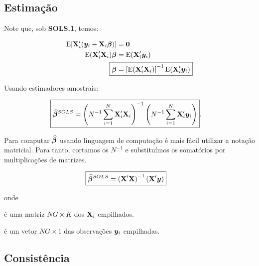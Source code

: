 \documentclass[11pt, oneside, a4paper, article]{article}
\numberwithin{equation}{section}
\begin{document}
\subsection{Estimação}
Note que, sob \textbf{SOLS.1}, temos:

\vspace{-1 em}
\begin{align} 
\notag
\E[ \Xmat_{i}' ( \mbs{y}_{i} - \Xmat_{i} \betavec ) ] &= \mbs{0}
\\
\notag
\E( \Xmat_{i}' \Xmat_{i} ) \betavec &= \E( \Xmat_{i}' \mbs{y}_{i} )  
\\
\label{sols:beta}
\Aboxed{
\betavec &=
\left[ \E( \Xmat_{i}' \Xmat_{i} )  \right]^{-1}
\E( \Xmat_{i}' \mbs{y}_{i} )  }
\end{align}

Usando estimadores amostrais:

\vspace{-1 em}
\begin{align} \label{sols:betahat}
\Aboxed{
\betahatbold^{SOLS} &=
\left( N^{-1} \sum_{i=1}^{N} \Xmat_{i}' \Xmat_{i}   \right)^{-1}
\left( N^{-1} \sum_{i=1}^{N} \Xmat_{i}' \mbs{y}_{i}   \right)
}.
\end{align}

Para computar $\widehat{\boldsymbol{\beta}}$ usando linguagem de computação é mais fácil utilizar a notação matricial.
Para tanto, cortamos os $N^{-1}$ e substituímos os somatórios por multiplicações de matrizes.

\vspace{-1 em}
\begin{align} 
\label{sols:betahat:mat}
\Aboxed{
\betahatbold^{SOLS} &=
\left(  \Xmat' \Xmat   \right)^{-1} \left(  \Xmat' \mbs{y}   \right)
}
\end{align}

\noindent
onde
\begin{description}[noitemsep]
\item [$\Xmat \equiv (\Xmat_{1}', \dots, \Xmat_{N}')$]  é uma matriz $NG \times K$ dos $\mathbf{X}_{i}$ empilhados.

\item [$\mbs{y} \equiv (\mbs{y}_{1}', \dots, \mbs{y}_{N}')$] é um vetor $NG \times 1$ das observações $\boldsymbol{y}_{i}$ empilhadas.
\end{description}

\subsection{Consistência}
\end{document}
